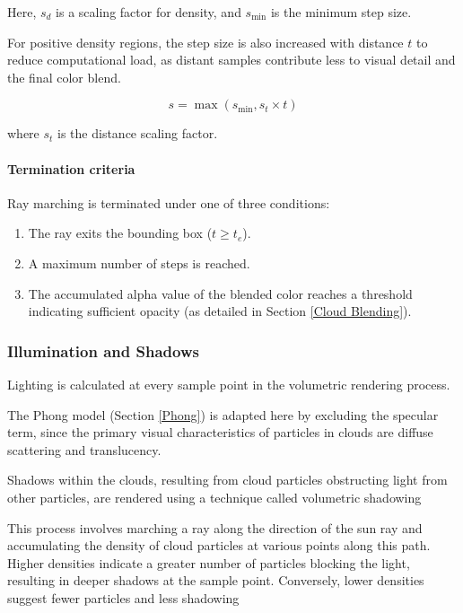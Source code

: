  Here, $s_d$ is a scaling factor for density, and $s_{\text{min}}$ is the minimum step size.

For positive density regions, the step size is also increased with distance $t$ to reduce computational load, as distant samples contribute less to visual detail and the final color blend.

\begin{equation}
     s = \max(s_{\text{min}}, s_t \times t)
\end{equation}

where $s_t$ is the distance scaling factor.

\paragraph{Termination criteria}

Ray marching is terminated under one of three conditions: 

\begin{enumerate}
    \item The ray exits the bounding box ($t\ge t_e$).
    \item A maximum number of steps is reached.
    \item The accumulated alpha value of the blended color reaches a threshold indicating sufficient opacity (as detailed in Section \ref{Cloud Blending}).
\end{enumerate}

\subsubsection{Illumination and Shadows}

Lighting is calculated at every sample point in the volumetric rendering process.

The Phong model (Section \ref{Phong}) is adapted here by excluding the specular term, since the primary visual characteristics of particles in clouds are diffuse scattering and translucency. 

Shadows within the clouds, resulting from cloud particles obstructing light from other particles, are rendered using a technique called volumetric shadowing

This process involves marching a ray along the direction of the sun ray and accumulating the density of cloud particles at various points along this path. Higher densities indicate a greater number of particles blocking the light, resulting in deeper shadows at the sample point. Conversely, lower densities suggest fewer particles and less shadowing

